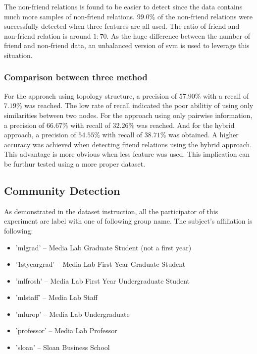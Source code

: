 \documentclass[11pt]{article}
\begin{document}

The non-friend relations is found to be easier to detect since the data contains much more samples of non-friend relations. $99.0\%$ of the non-friend relations were successfully detected when three features are all used. The ratio of friend and non-friend relation is around $1:70$. As the huge difference between the number of friend and non-friend data, an unbalanced version of svm is used to leverage this situation.

\subsubsection{Comparison between three method}
For the approach using topology structure, a precision of $57.90\%$ with a recall of $7.19\%$ was reached. The low rate of recall indicated the poor abilitiy of using only similarities between two nodes. For the approach using only pairwise information, a precision of $66.67\%$ with recall of $32.26\%$ was reached. And for the hybrid approach, a precision of $54.55\%$ with recall of $38.71\%$ was obtained. A higher accuracy was achieved when detecting friend relations using the hybrid approach. This advantage is more obvious when less feature was used. This implication can be furthur tested using a more proper dataset.

\subsection{Community Detection}
As demonstrated in the dataset instruction, all the participator of this experiment are label with one of following group name. The subject’s affiliation is following:
\begin{itemize}
\item 'mlgrad' – Media Lab Graduate Student (not a first year) 
\item '1styeargrad' – Media Lab First Year Graduate Student 
\item 'mlfrosh' – Media Lab First Year Undergraduate Student 
\item 'mlstaff' – Media Lab Staff
\item 'mlurop' – Media Lab Undergraduate
\item 'professor' – Media Lab Professor
\item 'sloan' – Sloan Business School
\end{itemize}
\end{document}
